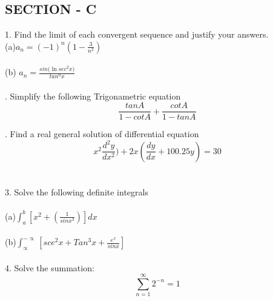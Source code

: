 \documentclass{article}
\begin{document}
\newpage


\vspace{5mm}
\subsection{SECTION - C}
\vspace{7mm}

1. Find the limit of each convergent sequence and justify your answers.\\
(a)$ a_n = (-1)^n (1 - \frac{3}{n^2}) $\\\\
(b) $a_n = \frac{sin(\ln{sec^2 x)}}{tan^n x}$\\\\

. Simplify the following Trigonametric equation 
$$ \frac{tanA}{1-cotA} + \frac{cotA}{1-tanA}$$

 . Find a real general solution of differential equation\\
$$x^2 \frac{d^2y}{dx^2}) + 2x(\frac{dy}{dx} + 100.25y) = 30$$\\\\

3. Solve the following definite integrals \\\\
\indent (a)$ \int_{a}^{b} [x^2+(\frac{1}{sinx^3})]dx $  \\\\
\indent (b)$ \int_{\propto}^{- \propto} [sce^2 x + Tan^3 x + \frac{e^x}{sinx} ]$ \\\\

4. Solve the summation:\\
\[ \sum_{n=1}^{\infty} 2^{-n} = 1 \]
\end{document}
